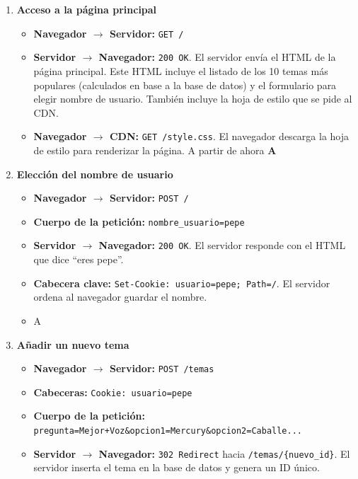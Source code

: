 \begin{enumerate}
  \item \textbf{Acceso a la página principal}
  \begin{itemize}
    \item \textbf{Navegador $\rightarrow$ Servidor:} \texttt{GET /}
    \item \textbf{Servidor $\rightarrow$ Navegador:} \texttt{200 OK}. El servidor envía el HTML de la página principal. Este HTML incluye el listado de los 10 temas más populares (calculados en base a la base de datos) y el formulario para elegir nombre de usuario. También incluye la hoja de estilo que se pide al CDN.
    \item \textbf{Navegador $\rightarrow$ CDN:} \texttt{GET /style.css}. El navegador descarga la hoja de estilo para renderizar la página. A partir de ahora {\bf \textcircled{A}}
  \end{itemize}

  \item \textbf{Elección del nombre de usuario}
  \begin{itemize}
     \item \textbf{Navegador $\rightarrow$ Servidor:} \texttt{POST /}
    \item \textbf{Cuerpo de la petición:} \texttt{nombre\_usuario=pepe}
    \item \textbf{Servidor $\rightarrow$ Navegador:} \texttt{200 OK}. El servidor responde con el HTML que dice ``eres pepe''.
    \item \textbf{Cabecera clave:} \texttt{Set-Cookie: usuario=pepe; Path=/}. El servidor ordena al navegador guardar el nombre.
    \item \textcircled{A}
  \end{itemize}

  \item \textbf{Añadir un nuevo tema}
  \begin{itemize}
    \item \textbf{Navegador $\rightarrow$ Servidor:} \texttt{POST /temas}
    \item \textbf{Cabeceras:} \texttt{Cookie: usuario=pepe}
    \item \textbf{Cuerpo de la petición:} \texttt{pregunta=Mejor+Voz\&opcion1=Mercury\&opcion2=Caballe...}
    \item \textbf{Servidor $\rightarrow$ Navegador:} \texttt{302 Redirect} hacia \texttt{/temas/\{nuevo\_id\}}. El servidor inserta el tema en la base de datos y genera un ID único.
  \end{itemize}


\end{enumerate}

